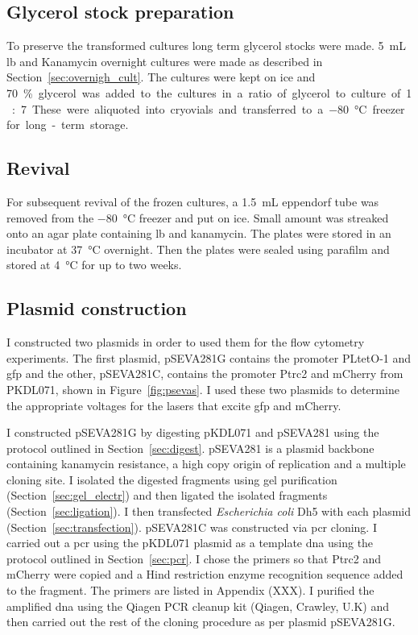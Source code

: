\subsection{Glycerol stock preparation}
\label{sec:glycerol_stock}
To preserve the transformed cultures long term glycerol stocks were made. \SI{5}{\milli\liter} \acrshort{lb} and Kanamycin overnight cultures were made as described in Section~\ref{sec:overnigh_cult}. The cultures were kept on ice and \SI{70}\% glycerol was added to the cultures in a ratio of glycerol to culture of 1:7. These were aliquoted into cryovials and transferred to a \SI{-80}{\celsius} freezer for long-term storage.


\subsection{Revival}
For subsequent revival of the frozen cultures, a \SI{1.5}{\milli\liter} eppendorf tube was removed from the \SI{-80}{\celsius} freezer and put on ice. Small amount was streaked onto an agar plate containing \acrshort{lb} and kanamycin. The plates were stored in an incubator at \SI{37}{\celsius} overnight. Then the plates were sealed using parafilm and stored at \SI{4}{\celsius} for up to two weeks. 


\subsection{Plasmid construction}

I constructed two plasmids in order to used them for the flow cytometry experiments. The first plasmid, pSEVA281G contains the promoter PLtetO-1 and \acrshort{gfp} and the other, pSEVA281C, contains the promoter Ptrc2 and mCherry from PKDL071, shown in Figure~\ref{fig:psevas}. I used these two plasmids to determine the appropriate voltages for the lasers that excite \acrshort{gfp} and mCherry.

I constructed pSEVA281G by digesting pKDL071 and pSEVA281 using the protocol outlined in Section~\ref{sec:digest}. pSEVA281 is a plasmid backbone containing kanamycin resistance, a high copy origin of replication and a multiple cloning site. I isolated the digested fragments using gel purification (Section~\ref{sec:gel_electr}) and then ligated the isolated fragments (Section~\ref{sec:ligation}). I then transfected \textit{Escherichia coli} Dh5\textalpha{} with each plasmid (Section~\ref{sec:transfection}). pSEVA281C was constructed via \acrshort{pcr} cloning. I carried out a \acrshort{pcr} using the pKDL071 plasmid as a template \acrshort{dna} using the protocol outlined in Section~\ref{sec:pcr}. I chose the primers so that Ptrc2 and mCherry were copied and a Hind restriction enzyme recognition sequence added to the fragment. The primers are listed in Appendix (XXX). I purified the amplified \acrshort{dna} using the Qiagen PCR cleanup kit (Qiagen, Crawley, U.K) and then carried out the rest of the cloning procedure as per plasmid pSEVA281G.

